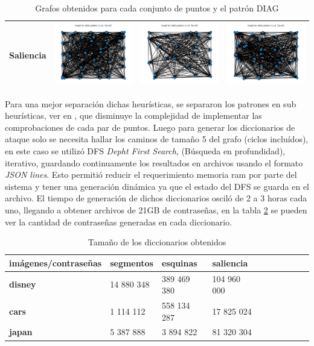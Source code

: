 \begin{table}[H]
\begin{tabular}{|c|c|c|c|}
		Saliencia & \includegraphics[width=3.5cm]{Graphics/disney-saliency-graph.png} 
		& \includegraphics[width=3.5cm]{Graphics/cars-saliency-graph.png} 
		& \includegraphics[width=3.5cm]{Graphics/japan-saliency-graph.png} \\ \hline
	\end{tabular}
	\caption{Grafos obtenidos para cada conjunto de puntos y el patr\'on DIAG}
	\label{graphs}
\end{table}


Para una mejor separaci\'on dichas heur\'isticas, se separaron los patrones en sub heur\'isticas, ver en \cite{van2010purely}, que disminuye la complejidad de implementar las comprobaciones de cada par de puntos. Luego para generar los diccionarios de ataque solo se necesita hallar los caminos de tama\~no 5 del grafo (ciclos inclu\'idos), en este caso se utiliz\'o DFS \textit{Depht First Search}, (B\'usqueda en profundidad), iterativo, guardando continuamente los resultados en archivos usando el formato \textit{JSON lines}. Esto permiti\'o reducir el requerimiento memoria ram por parte del sistema y tener una generaci\'on  din\'amica ya que el estado del DFS se guarda en el archivo. El tiempo de generaci\'on de dichos diccionarios oscil\'o de 2 a 3 horas cada uno, llegando a obtener archivos de 21GB de contrase\~nas, en la tabla \ref{dictionary:lengths} se pueden ver la cantidad de contrase\~nas generadas en cada diccionario.  

\begin{table}[H]
	\centering
	\caption{Tama\~no de los diccionarios obtenidos}
	\label{dictionary:lengths}
	\begin{tabular}{|l|l|l|l|l|l|l|l|l|l|}
		\hline
		\textbf{im\'agenes/contrase\~nas} & \textbf{segmentos} & \textbf{esquinas} & \textbf{saliencia }  \\ \hline
		\textbf{disney} & 14 880 348 & 389 469 380 & 104 960 000  \\ \hline
		\textbf{cars} & 1 114 112 & 558 134 287 & 17 825 024  \\ \hline
		\textbf{japan} & 5 387 888 & 3 894 822 & 81 320 304 \\ \hline
	\end{tabular}
\end{table}


